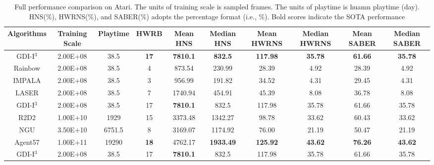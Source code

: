 \documentclass[nohyperref]{article}
\def\GDIImeanhns{7810.1}
\def\GDIImedianhns{832.5}
\def\GDIIHWRB{17}
\def\GDIImeanHWRNS{117.98}
\def\GDIImedianHWRNS{35.78}
\def\GDIImeanSABER{61.66}
\def\GDIImedianSABER{35.78}
\def\GDIInumframes{2.00E+08}
\def\GDIIgametime{38.5}
\def\rainbowmeanhns{873.54}
\def\rainbowmedianhns{230.99}
\def\rainbowHWRB{4}
\def\rainbowmeanHWRNS{28.39}
\def\rainbowmedianHWRNS{4.92}
\def\rainbowmeanSABER{28.39}
\def\rainbowmedianSABER{4.92}
\def\rainbownumframes{2.00E+08}
\def\rainbowgametime{38.5}
\def\impalameanhns{956.99}
\def\impalamedianhns{191.82}
\def\impalaHWRB{3}
\def\impalameanHWRNS{34.52}
\def\impalamedianHWRNS{4.31}
\def\impalameanSABER{29.45}
\def\impalamedianSABER{4.31}
\def\impalanumframes{2.00E+08}
\def\impalagametime{38.5}
\def\lasermeanhns{1740.94}
\def\lasermedianhns{454.91}
\def\laserHWRB{7}
\def\lasermeanHWRNS{45.39}
\def\lasermedianHWRNS{8.08}
\def\lasermeanSABER{36.78}
\def\lasermedianSABER{8.08}
\def\lasernumframes{2.00E+08}
\def\lasergametime{38.5}
\def\rtdtmeanhns{3373.48}
\def\rtdtmedianhns{1342.27}
\def\rtdtHWRB{15}
\def\rtdtmeanHWRNS{98.78}
\def\rtdtmedianHWRNS{33.62}
\def\rtdtmeanSABER{60.43}
\def\rtdtmedianSABER{33.62}
\def\rtdtnumframes{1.00E+10}
\def\rtdtgametime{1929}
\def\ngumeanhns{3169.07}
\def\ngumedianhns{1174.92}
\def\nguHWRB{8}
\def\ngumeanHWRNS{76.00}
\def\ngumedianHWRNS{21.19}
\def\ngumeanSABER{50.47}
\def\ngumedianSABER{21.19}
\def\ngunumframes{3.50E+10}
\def\ngugametime{6751.5}
\def\agentmeanhns{4762.17}
\def\agentmedianhns{1933.49}
\def\agentHWRB{18}
\def\agentmeanHWRNS{125.92}
\def\agentmedianHWRNS{43.62}
\def\agentmeanSABER{76.26}
\def\agentmedianSABER{43.62}
\def\agentnumframes{1.00E+11}
\def\agentgametime{19290}
\theoremstyle{plain}
\begin{document}
\begin{table}[H]
\footnotesize
\centering
\caption{Full performance comparison on Atari. The units of training scale is sampled frames. The units of playtime is huamn playtime (day). HNS(\%), HWRNS(\%), and SABER(\%) adopts the  percentage format (i.e., \%). Bold scores indicate the SOTA performance}
\label{Tab: full performance comparison}
\setlength{\tabcolsep}{1.0pt}
\begin{tabular}{ |c | c | c | c| c c | c c |c c|}
\hline
Algorithms & Training Scale & Playtime & HWRB & Mean HNS & Median HNS & Mean HWRNS & Median HWRNS & Mean SABER  & Median SABER\\
\hline
GDI-I$^3$        &\GDIInumframes    & \GDIIgametime    & \textbf{\GDIIHWRB} & \textbf{\GDIImeanhns} & \textbf{\GDIImedianhns}      &\textbf{\GDIImeanHWRNS} & \textbf{\GDIImedianHWRNS}& \textbf{\GDIImeanSABER} & \textbf{\GDIImedianSABER}\\
Rainbow     &\rainbownumframes    & \rainbowgametime     & \rainbowHWRB  & \rainbowmeanhns  & \rainbowmedianhns     &\rainbowmeanHWRNS  & \rainbowmedianHWRNS & \rainbowmeanSABER & \rainbowmedianSABER\\
IMPALA      &\impalanumframes    & \impalagametime     & \impalaHWRB  & \impalameanhns  & \impalamedianhns     &\impalameanHWRNS  & \impalamedianHWRNS & \impalameanSABER & \impalamedianSABER\\
LASER       &\lasernumframes    & \lasergametime     & \laserHWRB  & \lasermeanhns & \lasermedianhns     &\lasermeanHWRNS  & \lasermedianHWRNS & \lasermeanSABER & \lasermedianSABER\\
\hline
\hline
GDI-I$^3$        &\GDIInumframes    &\GDIIgametime   & \GDIIHWRB & \textbf{\GDIImeanhns} & \GDIImedianhns     &\GDIImeanHWRNS &\GDIImedianHWRNS & \GDIImeanSABER & \GDIImedianSABER\\
R2D2        &\rtdtnumframes   &\rtdtgametime     & \rtdtHWRB & \rtdtmeanhns & \rtdtmedianhns &\rtdtmeanHWRNS  & \rtdtmedianHWRNS& \rtdtmeanSABER & \rtdtmedianSABER \\
NGU         &\ngunumframes & \ngugametime    & \nguHWRB  & \ngumeanhns & \ngumedianhns    &\ngumeanHWRNS  & \ngumedianHWRNS& \ngumeanSABER & \ngumedianSABER\\
Agent57     &\agentnumframes   & \agentgametime      & \textbf{\agentHWRB} & \agentmeanhns & \textbf{\agentmedianhns}    &\textbf{\agentmeanHWRNS} & \textbf{\agentmedianHWRNS}& \textbf{\agentmeanSABER} & \textbf{\agentmedianSABER}\\
\hline
\hline
GDI-I$^3$       &\GDIInumframes    &\GDIIgametime    & \GDIIHWRB & \textbf{\GDIImeanhns} & \GDIImedianhns     &\GDIImeanHWRNS &\GDIImedianHWRNS & \GDIImeanSABER & \GDIImedianSABER\\

\end{tabular}
\end{table}
\end{document}
